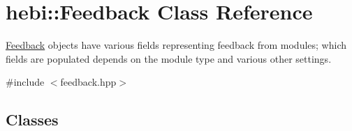 \hypertarget{classhebi_1_1Feedback}{}\section{hebi\+:\+:Feedback Class Reference}
\label{classhebi_1_1Feedback}


\hyperlink{classhebi_1_1Feedback}{Feedback} objects have various fields representing feedback from modules; which fields are populated depends on the module type and various other settings.  




{\ttfamily \#include $<$feedback.\+hpp$>$}

\subsection*{Classes}
